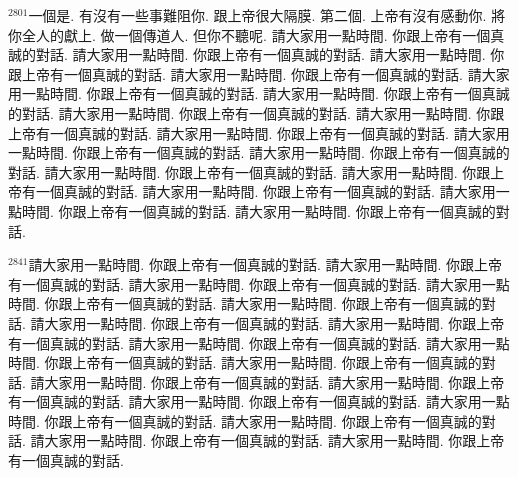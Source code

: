 \documentclass{book}
\begin{document}
$^{2801}$一個是.
有沒有一些事難阻你.
跟上帝很大隔膜.
第二個.
上帝有沒有感動你.
將你全人的獻上.
做一個傳道人.
但你不聽呢.
請大家用一點時間.
你跟上帝有一個真誠的對話.
請大家用一點時間.
你跟上帝有一個真誠的對話.
請大家用一點時間.
你跟上帝有一個真誠的對話.
請大家用一點時間.
你跟上帝有一個真誠的對話.
請大家用一點時間.
你跟上帝有一個真誠的對話.
請大家用一點時間.
你跟上帝有一個真誠的對話.
請大家用一點時間.
你跟上帝有一個真誠的對話.
請大家用一點時間.
你跟上帝有一個真誠的對話.
請大家用一點時間.
你跟上帝有一個真誠的對話.
請大家用一點時間.
你跟上帝有一個真誠的對話.
請大家用一點時間.
你跟上帝有一個真誠的對話.
請大家用一點時間.
你跟上帝有一個真誠的對話.
請大家用一點時間.
你跟上帝有一個真誠的對話.
請大家用一點時間.
你跟上帝有一個真誠的對話.
請大家用一點時間.
你跟上帝有一個真誠的對話.
請大家用一點時間.
你跟上帝有一個真誠的對話.

$^{2841}$請大家用一點時間.
你跟上帝有一個真誠的對話.
請大家用一點時間.
你跟上帝有一個真誠的對話.
請大家用一點時間.
你跟上帝有一個真誠的對話.
請大家用一點時間.
你跟上帝有一個真誠的對話.
請大家用一點時間.
你跟上帝有一個真誠的對話.
請大家用一點時間.
你跟上帝有一個真誠的對話.
請大家用一點時間.
你跟上帝有一個真誠的對話.
請大家用一點時間.
你跟上帝有一個真誠的對話.
請大家用一點時間.
你跟上帝有一個真誠的對話.
請大家用一點時間.
你跟上帝有一個真誠的對話.
請大家用一點時間.
你跟上帝有一個真誠的對話.
請大家用一點時間.
你跟上帝有一個真誠的對話.
請大家用一點時間.
你跟上帝有一個真誠的對話.
請大家用一點時間.
你跟上帝有一個真誠的對話.
請大家用一點時間.
你跟上帝有一個真誠的對話.
請大家用一點時間.
你跟上帝有一個真誠的對話.
請大家用一點時間.
你跟上帝有一個真誠的對話.
\newpage
\end{document}
